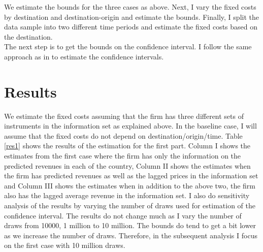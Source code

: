 \documentclass[11pt, letterpaper]{article} \usepackage{amsmath}
\begin{document}
We estimate the bounds for the three cases as above. Next, I vary the
fixed costs by destination and destination-origin and estimate the
bounds. Finally, I split the data sample into two different time
periods and estimate the fixed costs based on the
destination. \\
The next step is to get the bounds on the confidence interval. I
follow the same approach as in \citet{dickstein2018} to estimate the
confidence intervals.
\section{Results}
We estimate the fixed costs assuming that the firm has three different
sets of instruments in the information set as explained above. In the
baseline case, I will assume that the fixed costs do not depend on
destination/origin/time. Table \ref{res1} shows the results of the
estimation for the first part. Column I shows the estimates from the
first case where the firm has only the information on the predicted
revenues in each of the country, Column II shows the estimates when
the firm has predicted revenues as well as the lagged prices in the
information set and Column III shows the estimates when in addition to
the above two, the firm also has the lagged average revenue in the
information set.  I also do sensitivity analysis of the results by
varying the number of draws used for estimation of the confidence
interval. The results do not change much as I vary the number of draws
from 10000, 1 million to 10 million. The bounds do tend to get a bit
lower as we increase the number of draws. Therefore, in the subsequent
analysis I focus on the first case with 10 million draws.
\end{document}
